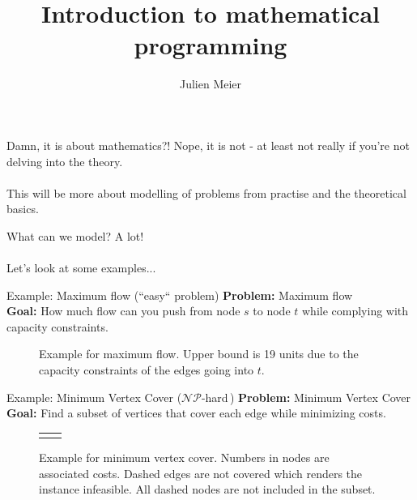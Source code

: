 \documentclass[10pt]{beamer}
\title{Introduction to mathematical programming}
\author{Julien Meier}
\newcommand{\primaryColorB}[1]{\textcolor{mpigreen}{\textbf{#1}}}
\newcommand{\q}[1]{``#1``}
\newcommand{\nphard}{$\mathcal{NP}$-hard\,}
\begin{document}
\maketitle

\begin{frame}{Damn, it is about mathematics?!}
Nope, it is not - at least not really if you're not delving into the theory.\\\,\\


This will be more about modelling of problems from practise and the theoretical basics.
\end{frame}

\begin{frame}{What can we model?}
A lot!\\\,\\

Let's look at some examples...
\end{frame}



\begin{frame}{Example: Maximum flow (\q{easy} problem)}
\primaryColorB{Problem:} Maximum flow\\
\primaryColorB{Goal:} How much flow can you push from node $s$ to node $t$ while complying with capacity constraints.\\

\begin{figure}
	\centering
	\scalebox{1.4}{\maxFlow}
	\caption{Example for maximum flow. Upper bound is 19 units due to the capacity constraints of the edges going into $t$.}
\end{figure}
\end{frame}

\begin{frame}{Example: Minimum Vertex Cover (\nphard)}
\primaryColorB{Problem:} Minimum Vertex Cover\\
\primaryColorB{Goal:} Find a subset of vertices that cover each edge while minimizing costs.\\

\begin{figure}
	\centering
\begin{tabular}{c c}
	\mvcSufficient
	\mvcInsufficient
\end{tabular}
	\caption{Example for minimum vertex cover. Numbers in nodes are associated costs. Dashed edges are not covered which renders the instance infeasible. All dashed nodes are not included in the subset.}
\end{figure}
\end{frame}
\end{document}
